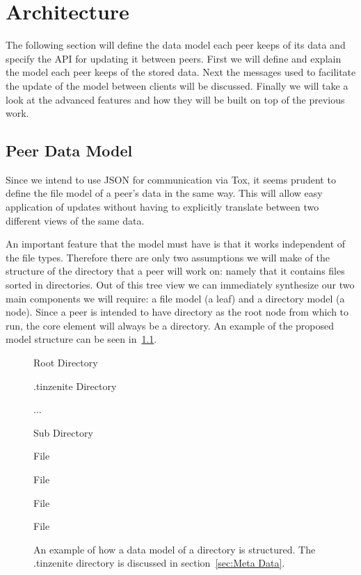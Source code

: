 \chapter{Architecture}
\label{chap:architecture}

The following section will define the data model each peer keeps of its data and specify the API for updating it between peers.
First we will define and explain the model each peer keeps of the stored data.
Next the messages used to facilitate the update of the model between clients will be discussed.
Finally we will take a look at the advanced features and how they will be built on top of the previous work.

\section{Peer Data Model}
\label{sec:Peer Data Model}

Since we intend to use JSON for communication via Tox, it seems prudent to define the file model of a peer's data in the same way.
This will allow easy application of updates without having to explicitly translate between two different views of the same data.

An important feature that the model must have is that it works independent of the file types.
Therefore there are only two assumptions we will make of the structure of the directory that a peer will work on: namely that it contains files sorted in directories.
Out of this tree view we can immediately synthesize our two main components we will require: a file model (a leaf) and a directory model (a node).
Since a peer is intended to have directory as the root node from which to run, the core element will always be a directory.
An example of the proposed model structure can be seen in~\ref{list:model}.

\begin{figure}[htp]
\begin{modellist}
\item Root Directory
    \begin{modellist}
        \item .tinzenite Directory
            \begin{modellist}
                \item ...
            \end{modellist}
        \item Sub Directory
            \begin{modellist}
                \item File
                \item File
            \end{modellist}
        \item File
        \item File
    \end{modellist}
\end{modellist}
\caption[Data Model Example Structure]{An example of how a data model of a directory is structured. The .tinzenite directory is discussed in section~\ref{sec:Meta Data}.}
\label{list:model}
\end{figure}

